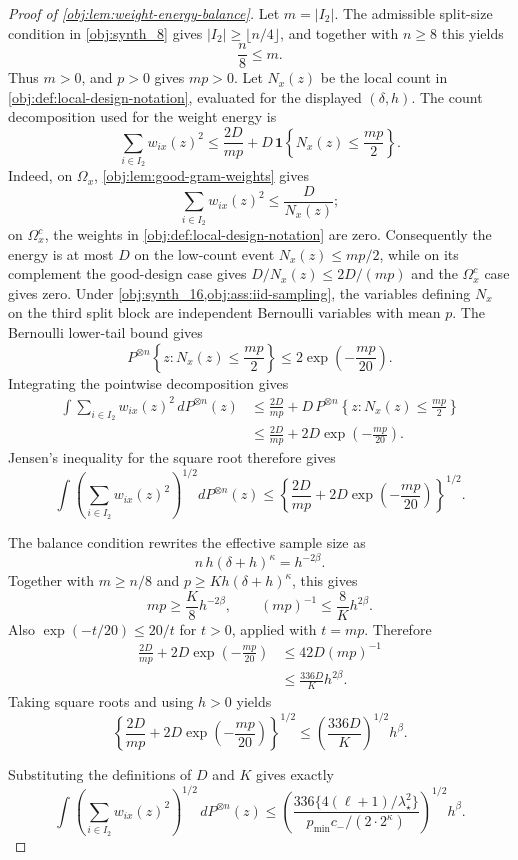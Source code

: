 \begin{proof}[Proof of \cref{obj:lem:weight-energy-balance}]
Let \(m=|I_2|\).  The admissible split-size condition in \cref{obj:synth_8}
gives \(|I_2|\ge\lfloor n/4\rfloor\), and together with \(n\ge8\) this yields
\[
        \frac n8\le m .
\]
Thus \(m>0\), and \(p>0\) gives \(mp>0\).  Let \(N_x(z)\)
be the local count in \cref{obj:def:local-design-notation}, evaluated for the
displayed \((\delta,h)\).  The count decomposition used for the weight energy is
\[
 \sum_{i\in I_2}w_{ix}(z)^2
 \le
 \frac{2D}{mp}
 +D\,\mathbf 1\!\left\{N_x(z)\le\frac{mp}{2}\right\}.
\]
Indeed, on \(\Omega_x\), \cref{obj:lem:good-gram-weights} gives
\[
        \sum_{i\in I_2}w_{ix}(z)^2\le \frac{D}{N_x(z)};
\]
on \(\Omega_x^c\), the weights in \cref{obj:def:local-design-notation} are zero.
Consequently the energy is at most \(D\) on the low-count event
\(N_x(z)\le mp/2\), while on its complement the good-design case gives
\(D/N_x(z)\le2D/(mp)\) and the \(\Omega_x^c\) case gives zero.
Under \cref{obj:synth_16,obj:ass:iid-sampling}, the variables defining
\(N_x\) on the third split block are independent Bernoulli variables with mean
\(p\).  The Bernoulli lower-tail bound gives
\[
 P^{\otimes n}\!\left\{z:N_x(z)\le\frac{mp}{2}\right\}
 \le
 2\exp\!\left(-\frac{mp}{20}\right).
\]
Integrating the pointwise decomposition gives
\[
\begin{aligned}
 \int\sum_{i\in I_2}w_{ix}(z)^2\,dP^{\otimes n}(z)
 &\le
 \frac{2D}{mp}
 +D\,P^{\otimes n}\!\left\{z:N_x(z)\le\frac{mp}{2}\right\} \\
 &\le
 \frac{2D}{mp}
 +2D\exp\!\left(-\frac{mp}{20}\right).
\end{aligned}
\]
Jensen's inequality for the square root therefore gives
\[
 \int\left(\sum_{i\in I_2}w_{ix}(z)^2\right)^{1/2}dP^{\otimes n}(z)
 \le
 \left\{
 \frac{2D}{mp}
 +2D\exp\!\left(-\frac{mp}{20}\right)
 \right\}^{1/2}.
\]

The balance condition rewrites the effective sample size as
\[
        n\,h(\delta+h)^\kappa=h^{-2\beta}.
\]
Together with \(m\ge n/8\) and \(p\ge K h(\delta+h)^\kappa\), this gives
\[
        mp\ge \frac K8 h^{-2\beta},
        \qquad
        (mp)^{-1}\le \frac8K h^{2\beta}.
\]
Also \(\exp(-t/20)\le20/t\) for \(t>0\), applied with \(t=mp\).  Therefore
\[
\begin{aligned}
 \frac{2D}{mp}+2D\exp\!\left(-\frac{mp}{20}\right)
 &\le
 42D(mp)^{-1}  \\
 &\le
 \frac{336D}{K}h^{2\beta}.
\end{aligned}
\]
Taking square roots and using \(h>0\) yields
\[
 \left\{
 \frac{2D}{mp}
 +2D\exp\!\left(-\frac{mp}{20}\right)
 \right\}^{1/2}
 \le
 \left(\frac{336D}{K}\right)^{1/2}h^\beta .
\]

Substituting the definitions of \(D\) and \(K\) gives exactly
\[
\int
\left(\sum_{i\in I_2} w_{ix}(z)^2\right)^{1/2}
\,dP^{\otimes n}(z)
\le
\left(
\frac{336\{4(\ell+1)/\lambda_\star^2\}}
{p_{\min}c_-/(2\cdot 2^\kappa)}
\right)^{1/2}
h^\beta .
\]
\end{proof}
